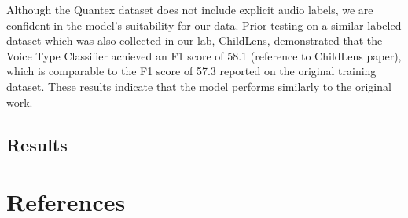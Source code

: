 \documentclass[
  man,floatsintext]{apa6}
\begin{document}
Although the Quantex dataset does not include explicit audio labels, we are confident in the model's suitability for our data. Prior testing on a similar labeled dataset which was also collected in our lab, ChildLens, demonstrated that the Voice Type Classifier achieved an F1 score of 58.1 (reference to ChildLens paper), which is comparable to the F1 score of 57.3 reported on the original training dataset. These results indicate that the model performs similarly to the original work.

\subsection{Results}\label{sup-results}

\newpage

\section{References}\label{references-1}

\begingroup
\setlength{\parindent}{-0.5in}
\setlength{\leftskip}{0.5in}
\end{document}
